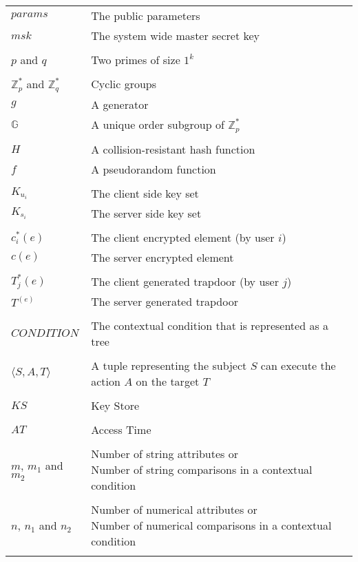 \documentclass[epsfig,a4paper,11pt,titlepage]{book}
\numberwithin{algorithm}{chapter}
\begin{document}
\begin{longtable}{l l}

$\mathit{params}$ & The public parameters \\
$\mathit{msk}$ & The system wide master secret key \\ \\
$p$ and $q$ & Two primes of size $1^k$ \\ \\
$\mathbb{Z}^*_p$ and $\mathbb{Z}^*_q$  & Cyclic groups \\
$g$ & A generator \\
$\mathbb{G}$ & A unique order subgroup of $\mathbb{Z}^*_p$ \\ \\
$H$ & A collision-resistant hash function \\
$f$ & A pseudorandom function \\ \\
$K_{u_i}$ & The client side key set \\
$K_{s_i}$ & The server side key set \\ \\
$c^*_i (e)$ & The client encrypted element (by user $i$) \\
$c (e)$ & The server encrypted element \\ \\
$T^*_j (e)$ & The client generated trapdoor (by user $j$) \\
$T^ (e)$ & The server generated trapdoor \\ \\
$\mathit{CONDITION}$ & The contextual condition that is represented as a tree \\ \\
$\langle S, A, T \rangle$ & \makecell[l]{A tuple representing the subject $S$ can execute \\ the action $A$ on the target $T$} \\ \\
$KS$ & Key Store \\ \\
$AT$ & Access Time \\ \\
$m$, $m_1$ and $m_2$ & \makecell[l]{Number of string attributes or \\ Number of string comparisons in a contextual condition} \\ \\
$n$, $n_1$ and $n_2$ & \makecell[l]{Number of numerical attributes or \\ Number of numerical comparisons in a contextual condition} \\ \\

\end{longtable}
\end{document}
